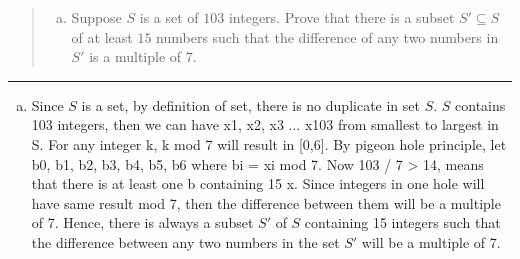 \documentclass[11pt]{article}
\begin{document}





\begin{quote}
\begin{enumerate}[(a)]
\item
Suppose $S$ is a set of $103$ integers. Prove that there is a
    subset $S' \subseteq S$ of at least $15$ numbers such that 
    the difference of any two numbers in $S'$ is a multiple of $7$.

\end{enumerate}
\end{quote}
\hrule


\begin{solution}
\item
\begin{enumerate}[(a)]
\item
    Since $S$ is a set, by definition of set, there is no duplicate in set $S$. $S$ contains 103 integers, then we can have x1, x2, x3 ... x103 from smallest to largest in S. For any integer k, k mod 7 will result in [0,6]. By pigeon hole principle, let b0, b1, b2, b3, b4, b5, b6 where bi = xi mod 7. Now 103 / 7 > 14, means that there is at least one b containing 15 x. Since integers in one hole will have same result mod 7, then the difference between them will be a multiple of 7. Hence, there is always a subset $S'$ of $S$ containing 15 integers such that the difference between any two numbers in the set $S'$ will be a multiple of 7.
\medskip

\end{enumerate}

\end{solution}
\end{document}
